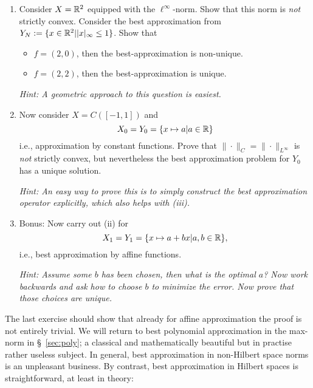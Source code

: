 \begin{exercise}
  \label{exr:prelims:bestapprox_maxnorms}
  \begin{enumerate}\ilist
  \item Consider $X = \mathbb{R}^2$ equipped with the $\ell^\infty$-norm. Show that
  this norm is {\em not} strictly convex. Consider the best approximation
  from $Y_N := \{ x \in \mathbb{R}^2 | |x|_\infty \leq 1 \}$. Show that
  \begin{itemize}
    \item $f = (2, 0)$, then the best-approximation is non-unique.
    \item $f = (2,2)$, then the best-approximation is unique.
  \end{itemize}
  {\it Hint: A geometric approach to this question is easiest. }

  \item Now consider $X = C([-1,1])$ and
  \[
    X_0 = Y_0 = \{ x \mapsto a | a \in \mathbb{R} \}
  \]
  i.e., approximation by constant functions. Prove that $\|\cdot\|_C =
  \|\cdot\|_{L^\infty}$ is {\em not} strictly convex, but nevertheless the best
  approximation problem for $Y_0$ has a unique solution.

  {\it Hint: An easy way to prove this is
  to simply construct the best approximation operator explicitly, which also
  helps with (iii).}

  \item {Bonus: } Now carry out (ii) for
  \[
      X_1 = Y_1 = \{ x \mapsto a + bx | a,b \in \mathbb{R} \},
  \]
  i.e., best approximation by affine functions.

  {\it Hint: Assume some $b$ has been chosen, then what is the optimal $a$? Now work backwards and ask how to choose $b$ to minimize the error. Now prove that those choices are unique.
  } \qedhere
  \end{enumerate}
\end{exercise}

The last exercise should show that already for affine approximation the proof is not entirely trivial. We will return to best polynomial approximation in the max-norm in \S~\ref{sec:poly}; a classical and mathematically beautiful but in practise rather useless subject. In general, best approximation in non-Hilbert space norms is an unpleasant business. By contrast, best approximation in Hilbert spaces is straightforward, at least in theory: 

